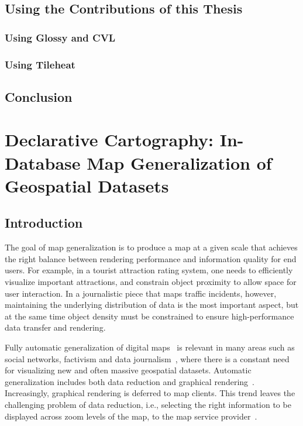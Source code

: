 \documentclass[11pt, oneside]{report}
\begin{document}
\section{Using the Contributions of this Thesis}

\subsection{Using Glossy and CVL}

\subsection{Using Tileheat}

\section{Conclusion}


\chapter{Declarative Cartography: In-Database Map Generalization of Geospatial Datasets}
\label{chapter:cvl}
\lstset{
  language=cvl
}

\section{Introduction}
\label{sec:cvl:introduction}
The goal of map generalization is to produce a map at a given scale that achieves the right balance between rendering performance and information quality for end users. For example, in a tourist attraction rating system, one needs to efficiently visualize important attractions, and constrain object proximity to allow space for user interaction. In a journalistic piece that maps traffic incidents, however, maintaining the underlying distribution of data is the most important aspect, but at the same time object density must be constrained to ensure high-performance data transfer and rendering.

Fully automatic generalization of digital maps~\cite{sarma2012fusiontables,nutanong2012multiresolution} is relevant in many areas such as social networks, factivism and data journalism~\cite{cohen2011journalism,bono,sankaranarayanan2009twitterstand}, where there is a constant need for visualizing new and often massive geospatial datasets. Automatic generalization includes both data reduction and graphical rendering~\cite{weibel1999generalising,gruenreich1985cag}. Increasingly, graphical rendering is deferred to map clients. This trend leaves the challenging problem of data reduction, i.e., selecting the right information to be displayed across zoom levels of the map, to the map service provider~\cite{gaffuri12vectortiles}. 
\end{document}
